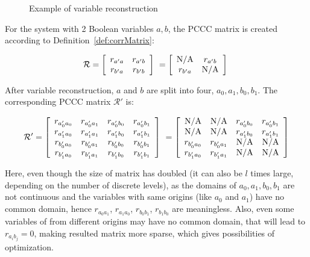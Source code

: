 \begin{figure}[ht]

\caption[Variable reconstruction]{Example of variable reconstruction}\label{varRec}
\end{figure}


For the system with 2 Boolean variables $a,b$, the PCCC matrix is created according to Definition~\ref{def:corrMatrix}:


$$\mathcal{R}=\left[
\begin{array}{*{20}c}
r_{a'a} & r_{a'b}\\
r_{b'a} & r_{b'b} \\
\end{array}
\right]\ =\left[
\begin{array}{*{20}c}
{\rm N/A} & r_{a'b}\\
r_{b'a} & {\rm N/A} \\
\end{array}
\right]\ 
$$

After variable reconstruction, $a$ and $b$ are split into four, $a_0,a_1,b_0,b_1$.
The corresponding PCCC matrix $\mathcal{R}'$ is:

$$\mathcal{R}'=\left[
\begin{array}{*{20}c}
r_{a'_0a_0} & r_{a'_0a_1}& r_{a'_0b_0}&r_{a'_0b_1}\\
r_{a'_1a_0} & r_{a'_1a_1}& r_{a'_1b_0}&r_{a'_1b_1}\\
r_{b'_0a_0} & r_{b'_0a_1}& r_{b'_0b_0}&r_{b'_0b_1}\\
r_{b'_1a_0} & r_{b'_1a_1}& r_{b'_1b_0}&r_{b'_1b_1}\\
\end{array}
\right]\ =\left[\begin{array}{*{20}c}
{\rm N/A} & {\rm N/A}& r_{a'_0b_0}&r_{a'_0b_1}\\
{\rm N/A} & {\rm N/A}& r_{a'_1b_0}&r_{a'_1b_1}\\
r_{b'_0a_0} & r_{b'_0a_1}& {\rm N/A}&{\rm N/A}\\
r_{b'_1a_0} & r_{b'_1a_1}& {\rm N/A}&{\rm N/A}\\
\end{array}\right]$$

Here, even though the size of matrix has doubled (it can also be $l$ times large, depending on the number of discrete levels), as the domains of $a_0,a_1,b_0,b_1$ are not continuous and the variables with same origins (like $a_0$ and $a_1$) have no common domain, hence $r_{a_0a_1}$, $r_{a_1a_0}$, $r_{b_0b_1}$, $r_{b_1b_0}$ are meaningless. 
Also, even some variables of from different origins may have no common domain, that will lead to $r_{a_ib_j}=0$, making resulted matrix more sparse, which gives possibilities of optimization.

